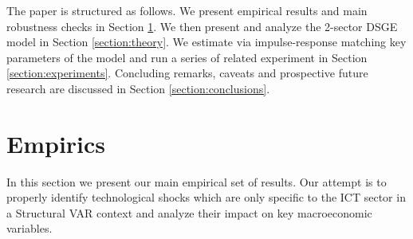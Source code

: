 \documentclass[12pt]{article}
\begin{document}

The paper is structured as follows. We present empirical results and main robustness checks in Section \ref{section:empirics}. We then present and analyze the 2-sector DSGE model in Section \ref{section:theory}. We estimate via impulse-response matching key parameters of the model and run a series of related experiment in Section \ref{section:experiments}. Concluding remarks, caveats and prospective future research are discussed in Section \ref{section:conclusions}.



\section{Empirics}\label{section:empirics}

In this section we present our main empirical set of results. Our attempt is to properly identify technological shocks which are only specific to the ICT sector in a Structural VAR context and analyze their impact on key macroeconomic variables.
\end{document}
